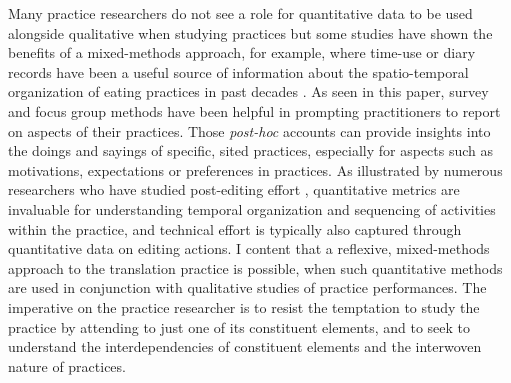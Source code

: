 \documentclass[output=paper,colorlinks,citecolor=brown]{langsci/langscibook}
\begin{document}
Many practice researchers do not see a role for quantitative data to be used alongside qualitative when studying practices but some studies have shown the benefits of a mixed-methods approach, for example, where time-use or diary records have been a useful source of information about the spatio-temporal organization of eating practices in past decades \citep{warde_changes_2007}. As seen in this paper, survey and focus group methods have been helpful in prompting practitioners to report on aspects of their practices. Those \textit{post-hoc} accounts can provide insights into the doings and sayings of specific, sited practices, especially for aspects such as motivations, expectations or preferences in practices. As illustrated by numerous researchers who have studied post-editing effort \citep[e.g.,][]{moorkens_correlations_2015,herbig_multi-modal_2019,macken_quantifying_2020}, quantitative metrics are invaluable for understanding temporal organization and sequencing of activities within the practice, and technical effort is typically also captured through quantitative data on editing actions. I content that a reflexive, mixed-methods approach to the translation practice is possible, when such quantitative methods are used in conjunction with qualitative studies of practice performances. The imperative on the practice researcher is to resist the temptation to study the practice by attending to just one of its constituent elements, and to seek to understand the interdependencies of constituent elements and the interwoven nature of practices. 

{\sloppy\printbibliography[heading=subbibliography,notkeyword=this]}
\end{document}
